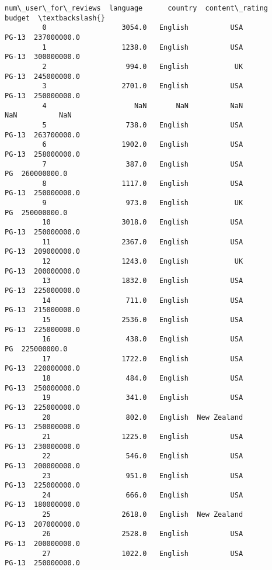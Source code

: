 \documentclass[11pt]{article}
\begin{document}
\begin{Verbatim}[commandchars=\\\{\}]
              num\_user\_for\_reviews  language      country  content\_rating       budget  \textbackslash{}
         0                  3054.0   English          USA           PG-13  237000000.0   
         1                  1238.0   English          USA           PG-13  300000000.0   
         2                   994.0   English           UK           PG-13  245000000.0   
         3                  2701.0   English          USA           PG-13  250000000.0   
         4                     NaN       NaN          NaN             NaN          NaN   
         5                   738.0   English          USA           PG-13  263700000.0   
         6                  1902.0   English          USA           PG-13  258000000.0   
         7                   387.0   English          USA              PG  260000000.0   
         8                  1117.0   English          USA           PG-13  250000000.0   
         9                   973.0   English           UK              PG  250000000.0   
         10                 3018.0   English          USA           PG-13  250000000.0   
         11                 2367.0   English          USA           PG-13  209000000.0   
         12                 1243.0   English           UK           PG-13  200000000.0   
         13                 1832.0   English          USA           PG-13  225000000.0   
         14                  711.0   English          USA           PG-13  215000000.0   
         15                 2536.0   English          USA           PG-13  225000000.0   
         16                  438.0   English          USA              PG  225000000.0   
         17                 1722.0   English          USA           PG-13  220000000.0   
         18                  484.0   English          USA           PG-13  250000000.0   
         19                  341.0   English          USA           PG-13  225000000.0   
         20                  802.0   English  New Zealand           PG-13  250000000.0   
         21                 1225.0   English          USA           PG-13  230000000.0   
         22                  546.0   English          USA           PG-13  200000000.0   
         23                  951.0   English          USA           PG-13  225000000.0   
         24                  666.0   English          USA           PG-13  180000000.0   
         25                 2618.0   English  New Zealand           PG-13  207000000.0   
         26                 2528.0   English          USA           PG-13  200000000.0   
         27                 1022.0   English          USA           PG-13  250000000.0   

\end{Verbatim}
\end{document}
